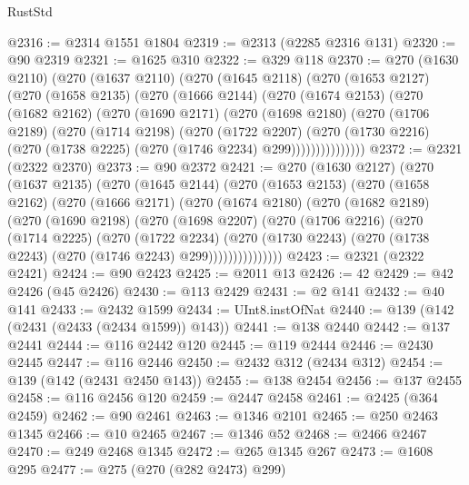 \begin{lexlean}{RustStd}
\begin{coremodule}
@2316 := @2314 @1551 @1804
@2319 := @2313 (@2285 @2316 @131)
@2320 := @90 @2319
@2321 := @1625 @310
@2322 := @329 @118
@2370 := @270
    (@1630 @2110)
    (@270
      (@1637 @2110)
      (@270
        (@1645 @2118)
        (@270
          (@1653 @2127)
          (@270
            (@1658 @2135)
            (@270
              (@1666 @2144)
              (@270
                (@1674 @2153)
                (@270
                  (@1682 @2162)
                  (@270
                    (@1690 @2171)
                    (@270
                      (@1698 @2180)
                      (@270
                        (@1706 @2189)
                        (@270
                          (@1714 @2198)
                          (@270
                            (@1722 @2207)
                            (@270
                              (@1730 @2216)
                              (@270 (@1738 @2225) (@270 (@1746 @2234) @299)))))))))))))))
@2372 := @2321 (@2322 @2370)
@2373 := @90 @2372
@2421 := @270
    (@1630 @2127)
    (@270
      (@1637 @2135)
      (@270
        (@1645 @2144)
        (@270
          (@1653 @2153)
          (@270
            (@1658 @2162)
            (@270
              (@1666 @2171)
              (@270
                (@1674 @2180)
                (@270
                  (@1682 @2189)
                  (@270
                    (@1690 @2198)
                    (@270
                      (@1698 @2207)
                      (@270
                        (@1706 @2216)
                        (@270
                          (@1714 @2225)
                          (@270
                            (@1722 @2234)
                            (@270
                              (@1730 @2243)
                              (@270 (@1738 @2243) (@270 (@1746 @2243) @299)))))))))))))))
@2423 := @2321 (@2322 @2421)
@2424 := @90 @2423
@2425 := @2011 @13
@2426 := 42
@2429 := @42 @2426 (@45 @2426)
@2430 := @113 @2429
@2431 := @2 @141
@2432 := @40 @141
@2433 := @2432 @1599
@2434 := UInt8.instOfNat
@2440 := @139 (@142 (@2431 (@2433 (@2434 @1599)) @143))
@2441 := @138 @2440
@2442 := @137 @2441
@2444 := @116 @2442 @120
@2445 := @119 @2444
@2446 := @2430 @2445
@2447 := @116 @2446
@2450 := @2432 @312 (@2434 @312)
@2454 := @139 (@142 (@2431 @2450 @143))
@2455 := @138 @2454
@2456 := @137 @2455
@2458 := @116 @2456 @120
@2459 := @2447 @2458
@2461 := @2425 (@364 @2459)
@2462 := @90 @2461
@2463 := @1346 @2101
@2465 := @250 @2463 @1345
@2466 := @10 @2465
@2467 := @1346 @52
@2468 := @2466 @2467
@2470 := @249 @2468 @1345
@2472 := @265 @1345 @267
@2473 := @1608 @295
@2477 := @275 (@270 (@282 @2473) @299)

\end{coremodule}
\end{lexlean}
